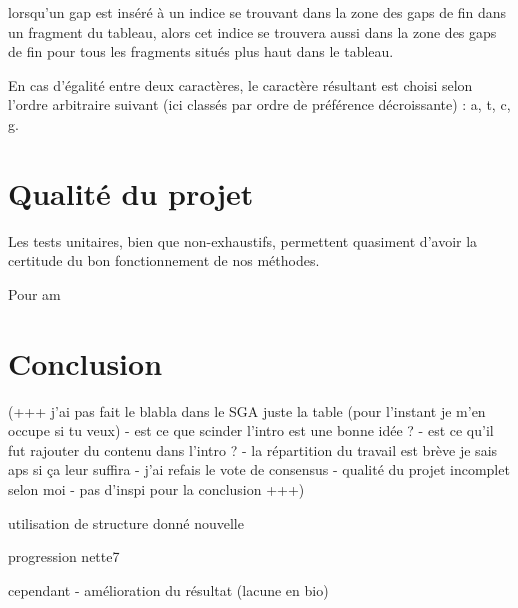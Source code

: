 \documentclass{article}
\begin{document}
 lorsqu'un gap est inséré à un indice se trouvant dans la zone des gaps de fin dans un fragment du tableau, alors cet indice se trouvera aussi dans la zone des gaps de fin pour tous les fragments situés plus haut dans le tableau. 

En cas d'égalité entre deux caractères, le caractère résultant est choisi selon l'ordre arbitraire suivant (ici classés par ordre de préférence décroissante) : a, t, c, g.

\section{Qualité du projet}



Les tests unitaires, bien que non-exhaustifs, permettent quasiment d'avoir la certitude du bon fonctionnement de nos méthodes.


Pour am


\section{Conclusion}

(+++ j'ai pas fait le blabla dans le SGA juste la table (pour l'instant je m'en occupe si tu veux)  - est ce que scinder l'intro est une bonne idée ? - est ce qu'il fut rajouter du contenu dans l'intro ? -  la répartition du travail est brève je sais aps si ça leur suffira -  j'ai refais le vote de consensus -  qualité du projet incomplet selon moi - pas d'inspi pour la conclusion +++)

utilisation de structure donné nouvelle

progression nette7

cependant - amélioration du résultat (lacune en bio)
\end{document}
